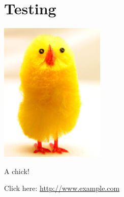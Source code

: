 \chapter{Testing}

\begin{table}[tbhp]
\includegraphics{chick}
\caption{A chick!}
\end{table}


Click here: \url{http://www.example.com}